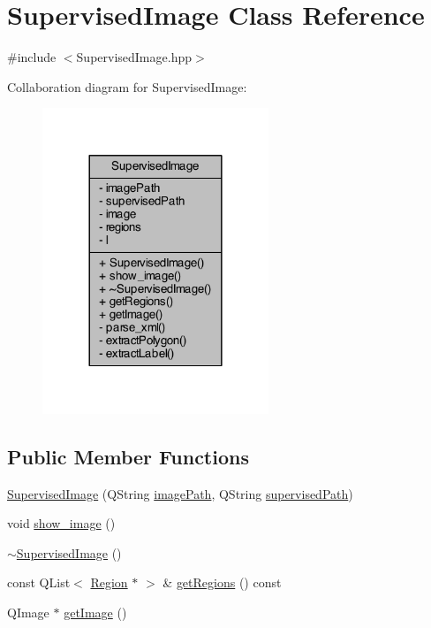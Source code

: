\hypertarget{class_supervised_image}{\section{Supervised\+Image Class Reference}
\label{class_supervised_image}
}


{\ttfamily \#include $<$Supervised\+Image.\+hpp$>$}



Collaboration diagram for Supervised\+Image\+:
\nopagebreak
\begin{figure}[H]
\begin{center}
\leavevmode
\includegraphics[width=192pt]{class_supervised_image__coll__graph}
\end{center}
\end{figure}
\subsection*{Public Member Functions}
\begin{DoxyCompactItemize}
\item 
\hyperlink{class_supervised_image_a032c9ef022d741cfb65c683ed11029ed}{Supervised\+Image} (Q\+String \hyperlink{class_supervised_image_a39f8b0212d2dae489d7b060b0d8dd1b9}{image\+Path}, Q\+String \hyperlink{class_supervised_image_aeeb634f3804dffba600e6aea71fc353e}{supervised\+Path})
\item 
void \hyperlink{class_supervised_image_aa2ab17f3c0be74a99858965e2cddb298}{show\+\_\+image} ()
\item 
\hyperlink{class_supervised_image_a4e9cb98175c10635ff6b4aedb578d70e}{$\sim$\+Supervised\+Image} ()
\item 
const Q\+List$<$ \hyperlink{class_region}{Region} $\ast$ $>$ \& \hyperlink{class_supervised_image_a1ffbba524b28567da37e849f5bb5dbf7}{get\+Regions} () const 
\item 
Q\+Image $\ast$ \hyperlink{class_supervised_image_aaf7160e7c4a85e4c68f36f62e39b6bfa}{get\+Image} ()
\end{DoxyCompactItemize}
